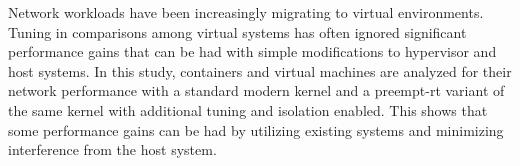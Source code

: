 Network workloads have been increasingly migrating to virtual environments.
Tuning in comparisons among virtual systems has often ignored significant performance gains that can be had with simple modifications to hypervisor and host systems.
In this study, containers and virtual machines are analyzed for their network performance with a standard modern kernel and a preempt-rt variant of the same kernel with additional tuning and isolation enabled.  
This shows that some performance gains can be had by utilizing existing systems and minimizing interference from the host system.
